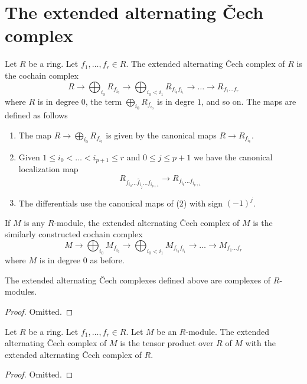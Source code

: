 \section{The extended alternating {\v C}ech complex}
\label{section-alternating-cech}

\noindent
Let $R$ be a ring. Let $f_1, \ldots, f_r \in R$. The extended alternating
{\v C}ech complex of $R$ is the cochain complex
$$
R \to \bigoplus\nolimits_{i_0} R_{f_{i_0}} \to
\bigoplus\nolimits_{i_0 < i_1} R_{f_{i_0}f_{i_1}} \to
\ldots \to R_{f_1\ldots f_r}
$$
where $R$ is in degree $0$, the term $\bigoplus_{i_0} R_{f_{i_0}}$
is in degre $1$, and so on. The maps are defined as follows
\begin{enumerate}
\item The map $R \to \bigoplus\nolimits_{i_0} R_{f_{i_0}}$
is given by the canonical maps $R \to R_{f_{i_0}}$.
\item Given $1 \leq i_0 < \ldots < i_{p + 1} \leq r$ and
$0 \leq j \leq p + 1$ we have the canonical localization map
$$
R_{f_{i_0} \ldots \hat f_{i_j} \ldots f_{i_{p + 1}}} \to
R_{f_{i_0} \ldots f_{i_{p + 1}}}
$$
\item The differentials use the canonical maps of (2) with sign $(-1)^j$.
\end{enumerate}
If $M$ is any $R$-module, the extended alternating {\v C}ech complex
of $M$ is the similarly constructed cochain complex
$$
M \to \bigoplus\nolimits_{i_0} M_{f_{i_0}} \to
\bigoplus\nolimits_{i_0 < i_1} M_{f_{i_0}f_{i_1}} \to
\ldots \to M_{f_1\ldots f_r}
$$
where $M$ is in degree $0$ as before.

\begin{lemma}
\label{lemma-extended-alternating-is-complex}
The extended alternating {\v C}ech complexes defined above
are complexes of $R$-modules.
\end{lemma}

\begin{proof}
Omitted.
\end{proof}

\begin{lemma}
\label{lemma-extended-alternating-form-module}
Let $R$ be a ring. Let $f_1, \ldots, f_r \in R$. Let $M$ be an $R$-module.
The extended alternating {\v C}ech complex of $M$ is the tensor product
over $R$ of $M$ with the extended alternating {\v C}ech complex of $R$.
\end{lemma}

\begin{proof}
Omitted.
\end{proof}

